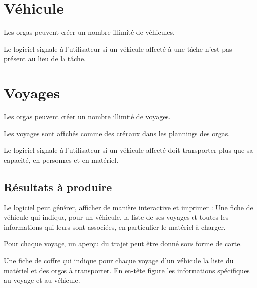 \section{Véhicule}

Les orgas peuvent créer un nombre illimité de véhicules.


Le logiciel signale à l'utilisateur si un véhicule affecté à une tâche n'est pas présent au lieu de la tâche.





\section{Voyages}

Les orgas peuvent créer un nombre illimité de voyages.

Les voyages sont affichés comme des crénaux dans les plannings des orgas.

Le logiciel signale à l'utilisateur si un véhicule affecté doit transporter plus que sa capacité, en personnes et en matériel.

\subsection{Résultats à produire}
Le logiciel peut générer, afficher de manière interactive et imprimer :
Une fiche de véhicule qui indique, pour un véhicule, la liste de ses voyages et toutes les informations qui leurs sont associées, en particulier le matériel à charger.

Pour chaque voyage, un aperçu du trajet peut être donné sous forme de carte.

Une fiche de coffre qui indique pour chaque voyage d'un véhicule la liste du matériel et des orgas à transporter.
En en-tête figure les informations spécifiques au voyage et au véhicule.


